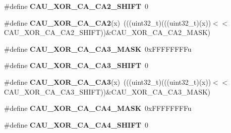 \begin{DoxyCompactItemize}
\item 
\#define {\bfseries C\+A\+U\+\_\+\+X\+O\+R\+\_\+\+C\+A\+\_\+\+C\+A2\+\_\+\+S\+H\+I\+FT}~0\hypertarget{group__CAU__Register__Masks_gaaa37d49b203514cc1d0d59ef3dc5d4b0}{}\label{group__CAU__Register__Masks_gaaa37d49b203514cc1d0d59ef3dc5d4b0}

\item 
\#define {\bfseries C\+A\+U\+\_\+\+X\+O\+R\+\_\+\+C\+A\+\_\+\+C\+A2}(x)~(((uint32\+\_\+t)(((uint32\+\_\+t)(x))$<$$<$C\+A\+U\+\_\+\+X\+O\+R\+\_\+\+C\+A\+\_\+\+C\+A2\+\_\+\+S\+H\+I\+FT))\&C\+A\+U\+\_\+\+X\+O\+R\+\_\+\+C\+A\+\_\+\+C\+A2\+\_\+\+M\+A\+SK)\hypertarget{group__CAU__Register__Masks_ga14a8b8358657a8eceb13d03a4204b01a}{}\label{group__CAU__Register__Masks_ga14a8b8358657a8eceb13d03a4204b01a}

\item 
\#define {\bfseries C\+A\+U\+\_\+\+X\+O\+R\+\_\+\+C\+A\+\_\+\+C\+A3\+\_\+\+M\+A\+SK}~0x\+F\+F\+F\+F\+F\+F\+F\+Fu\hypertarget{group__CAU__Register__Masks_gac7b046ce31fba66e970b3459c24a10f9}{}\label{group__CAU__Register__Masks_gac7b046ce31fba66e970b3459c24a10f9}

\item 
\#define {\bfseries C\+A\+U\+\_\+\+X\+O\+R\+\_\+\+C\+A\+\_\+\+C\+A3\+\_\+\+S\+H\+I\+FT}~0\hypertarget{group__CAU__Register__Masks_ga524188c17d8d070ce35b78f3a1bd8d89}{}\label{group__CAU__Register__Masks_ga524188c17d8d070ce35b78f3a1bd8d89}

\item 
\#define {\bfseries C\+A\+U\+\_\+\+X\+O\+R\+\_\+\+C\+A\+\_\+\+C\+A3}(x)~(((uint32\+\_\+t)(((uint32\+\_\+t)(x))$<$$<$C\+A\+U\+\_\+\+X\+O\+R\+\_\+\+C\+A\+\_\+\+C\+A3\+\_\+\+S\+H\+I\+FT))\&C\+A\+U\+\_\+\+X\+O\+R\+\_\+\+C\+A\+\_\+\+C\+A3\+\_\+\+M\+A\+SK)\hypertarget{group__CAU__Register__Masks_ga1cabdcb13efdab3f163c0d3b605585f0}{}\label{group__CAU__Register__Masks_ga1cabdcb13efdab3f163c0d3b605585f0}

\item 
\#define {\bfseries C\+A\+U\+\_\+\+X\+O\+R\+\_\+\+C\+A\+\_\+\+C\+A4\+\_\+\+M\+A\+SK}~0x\+F\+F\+F\+F\+F\+F\+F\+Fu\hypertarget{group__CAU__Register__Masks_gac44f628ba27da8192d8e570f745e5a0d}{}\label{group__CAU__Register__Masks_gac44f628ba27da8192d8e570f745e5a0d}

\item 
\#define {\bfseries C\+A\+U\+\_\+\+X\+O\+R\+\_\+\+C\+A\+\_\+\+C\+A4\+\_\+\+S\+H\+I\+FT}~0\hypertarget{group__CAU__Register__Masks_gad185523c9ec94202cae6663e3a76423f}{}\label{group__CAU__Register__Masks_gad185523c9ec94202cae6663e3a76423f}


\end{DoxyCompactItemize}
